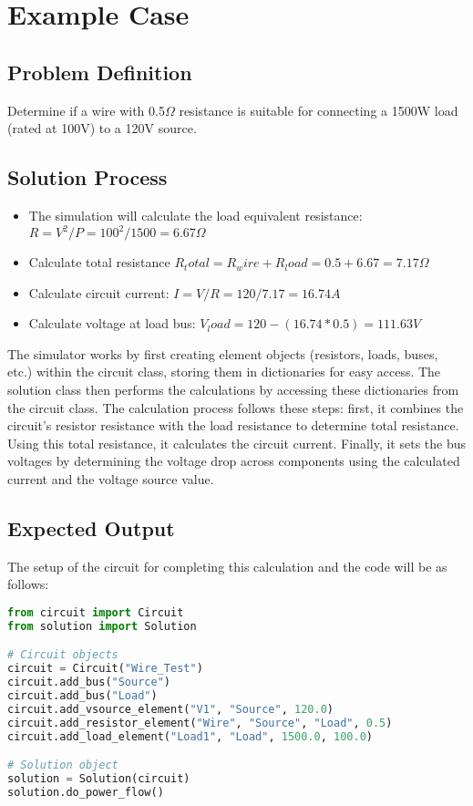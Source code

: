 \documentclass{article}
\begin{document}
	\section{Example Case}
	
	\subsection{Problem Definition}
	Determine if a wire with 0.5$\Omega$ resistance is suitable for connecting a 1500W load (rated at 100V) to a 120V source.	
	
	\subsection{Solution Process}
	\begin{itemize}
		\item 	The simulation will calculate the load equivalent resistance: $R = V^2/P = 100^2/1500 = 6.67\Omega$
		
		\item Calculate total resistance $R_total = R_wire + R_load = 0.5 + 6.67 = 7.17 \Omega$
		
		\item Calculate circuit current: $I = V/R = 120/7.17 = 16.74A$
		
		\item Calculate voltage at load bus: $V_load = 120 - (16.74 * 0.5) = 111.63V$
	\end{itemize}
	
	The simulator works by first creating element objects (resistors, loads, buses, etc.) within the circuit class, storing them in dictionaries for easy access. The solution class then performs the calculations by accessing these dictionaries from the circuit class. The calculation process follows these steps: first, it combines the circuit's resistor resistance with the load resistance to determine total resistance. Using this total resistance, it calculates the circuit current. Finally, it sets the bus voltages by determining the voltage drop across components using the calculated current and the voltage source value.	
	
	\subsection{Expected Output}
	The setup of the circuit for completing this calculation and the code will be as follows:
	
	\begin{lstlisting}[language=Python]
from circuit import Circuit
from solution import Solution

# Circuit objects
circuit = Circuit("Wire_Test")
circuit.add_bus("Source")
circuit.add_bus("Load")
circuit.add_vsource_element("V1", "Source", 120.0)
circuit.add_resistor_element("Wire", "Source", "Load", 0.5)
circuit.add_load_element("Load1", "Load", 1500.0, 100.0)

# Solution object
solution = Solution(circuit)
solution.do_power_flow()
	\end{lstlisting}
	
\end{document}
